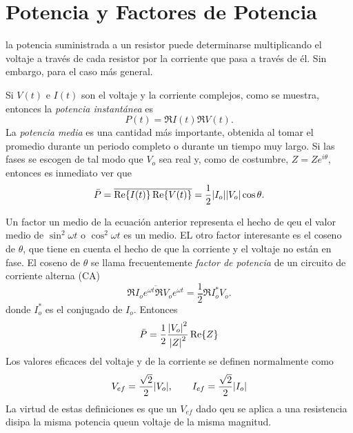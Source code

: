 \section{Potencia y Factores de Potencia}
la potencia suministrada a un resistor puede determinarse multiplicando el voltaje a través de cada resistor por la corriente que pasa a través de él. Sin embargo, para el caso más general.

\begin{tcolorbox}
	Si $V(t)$ e $I(t)$ son el voltaje y la corriente complejos, como se muestra, entonces la \textit{potencia instantánea} es
	\begin{equation}
		P(t) = \Re{I(t)} \Re{V(t)}.
	\end{equation}
	La \textit{potencia media} es una cantidad más importante, obtenida al tomar el promedio durante un periodo completo o durante un tiempo muy largo. Si las fases se escogen de tal modo que $V_o$ sea real y, como de costumbre, $Z = Ze^{i\theta}$, entonces es inmediato ver que
	\begin{equation}
		\bar{P} = \overline{\Re{I(t)} \Re{V(t)}} = \frac{1}{2} \abs{I_o} \abs{V_o} \cos{\theta}.
	\end{equation}
\end{tcolorbox}
Un factor un medio de la ecuación anterior representa el hecho de qeu el valor medio de $\sin ^2 {\omega t}$ o $\cos ^2 {\omega t}$ es un medio. EL otro factor interesante es el coseno de $\theta$, que tiene en cuenta el hecho de que la corriente y el voltaje no están en fase. El coseno de $\theta$ se llama frecuentemente \textit{factor de potencia} de un circuito de corriente alterna (CA)
\begin{equation}
	\overline{\Re{I_o e^{\omega t}} \Re{V_o e^{\omega t}}} = \frac{1}{2} \Re{I_o ^* V_o}.
\end{equation}
donde $I_o ^*$ es el conjugado de $I_o$. Entonces
\begin{equation}
	\bar{P} = \frac{1}{2} \frac{\abs{V_o}^2}{\abs{Z}^2} \Re{Z}
\end{equation}
Los valores eficaces del voltaje y de la corriente se definen normalmente como
\begin{equation}
	V_{ef} = \frac{\sqrt{2}}{2} \abs{V_o}, \qquad I_{ef} = \frac{\sqrt{2}}{2} \abs{I_o}
\end{equation}
La virtud de estas definiciones es que un $V_{ef}$ dado qeu se aplica a una resistencia disipa la misma potencia queun voltaje de la misma magnitud.





